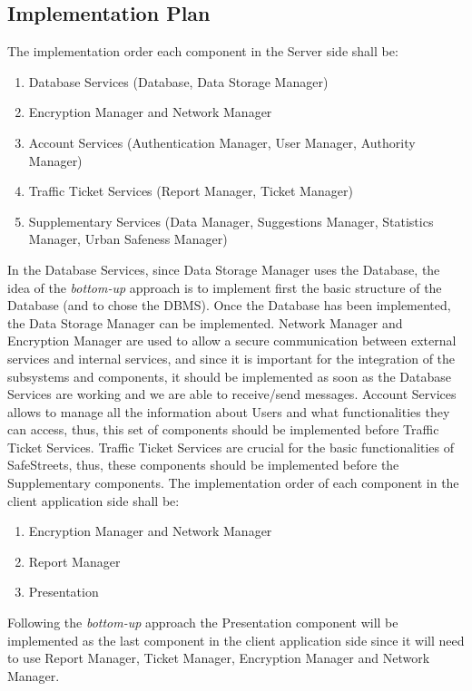 \subsection{Implementation Plan}
The implementation order each component in the Server side shall be:
\begin{enumerate}
    \item Database Services (Database, Data Storage Manager)
    \item Encryption Manager and Network Manager
    \item Account Services (Authentication Manager, User Manager, Authority Manager)
    \item Traffic Ticket Services (Report Manager, Ticket Manager)
    \item Supplementary Services (Data Manager, Suggestions Manager, Statistics Manager, Urban Safeness Manager)
\end{enumerate}
In the Database Services, since Data Storage Manager uses the Database, the idea of the \textit{bottom-up} approach is to implement first the basic structure of the Database (and to chose the DBMS). Once the Database has been implemented, the Data Storage Manager can be implemented.\newline
Network Manager and Encryption Manager are used to allow a secure communication between external services and internal services, and since it is important for the integration of the subsystems and components, it should be implemented as soon as the Database Services are working and we are able to receive/send messages.\newline
Account Services allows to manage all the information about Users and what functionalities they can access, thus, this set of components should be implemented before Traffic Ticket Services.\newline
Traffic Ticket Services are crucial for the basic functionalities of SafeStreets, thus, these components should be implemented before the Supplementary components.\newline
The implementation order of each component in the client application side shall be:
\begin{enumerate}
	\item Encryption Manager and Network Manager
	\item Report Manager
	\item Presentation
\end{enumerate}
Following the \textit{bottom-up} approach the Presentation component will be implemented as the last component in the client application side since it will need to use Report Manager, Ticket Manager, Encryption Manager and Network Manager.
